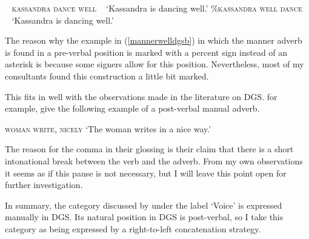 \begin{exe}
\ex\label{mannerwelldgs}\begin{xlist}
\ex \textcolor{white}{\%}\textsc{kassandra dance well} 
\glt \textcolor{white}{\%}`Kassandra is dancing well.' \label{mannerwelldgsa}
\ex \%\textsc{kassandra well dance} 
\glt \textcolor{white}{\%}`Kassandra is dancing well.' \label{mannerwelldgsb}
\end{xlist}
\end{exe}

\largerpage
\noindent The reason why the example in (\ref{mannerwelldgsb}) in which the manner adverb is found in a pre-verbal position is marked with a percent sign instead of an asterisk is because some signers allow for this position. Nevertheless, most of my consultants found this construction a little bit marked.


This fits in well with the observations made in the literature on DGS. \citet[282]{happ2014vork} for example, give the following example of a post-verbal manual adverb.

\begin{exe}
\ex \textsc{woman write, nicely}
\glt `The woman writes in a nice way.'
\end{exe}

\noindent The reason for the comma in their glossing is their claim that there is a short intonational break between the verb and the adverb. From my own observations it seems as if this pause is not necessary, but I will leave this point open for further investigation.

In summary, the category discussed by \citet{cinque1999adverbs} under the label `Voice' is expressed manually in DGS.  Its natural position in DGS is post-verbal, so I take this category as being expressed by a right-to-left concatenation strategy.




